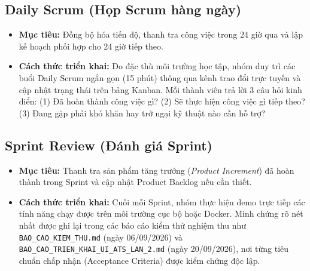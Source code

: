\subsection{Daily Scrum (Họp Scrum hàng ngày)}
\begin{itemize}
    \item \textbf{Mục tiêu:} Đồng bộ hóa tiến độ, thanh tra công việc trong 24 giờ qua và lập kế hoạch phối hợp cho 24 giờ tiếp theo.
    \item \textbf{Cách thức triển khai:} Do đặc thù môi trường học tập, nhóm duy trì các buổi Daily Scrum ngắn gọn (15 phút) thông qua kênh trao đổi trực tuyến và cập nhật trạng thái trên bảng Kanban. Mỗi thành viên trả lời 3 câu hỏi kinh điển: (1) Đã hoàn thành công việc gì? (2) Sẽ thực hiện công việc gì tiếp theo? (3) Đang gặp phải khó khăn hay trở ngại kỹ thuật nào cần hỗ trợ?
\end{itemize}

\subsection{Sprint Review (Đánh giá Sprint)}
\begin{itemize}
    \item \textbf{Mục tiêu:} Thanh tra sản phẩm tăng trưởng (\textit{Product Increment}) đã hoàn thành trong Sprint và cập nhật Product Backlog nếu cần thiết.
    \item \textbf{Cách thức triển khai:} Cuối mỗi Sprint, nhóm thực hiện demo trực tiếp các tính năng chạy được trên môi trường cục bộ hoặc Docker. Minh chứng rõ nét nhất được ghi lại trong các báo cáo kiểm thử nghiệm thu như \texttt{BAO\_CAO\_KIEM\_THU.md} (ngày 06/09/2026) và \texttt{BAO\_CAO\_TRIEN\_KHAI\_UI\_ATS\_LAN\_2.md} (ngày 20/09/2026), nơi từng tiêu chuẩn chấp nhận (Acceptance Criteria) được kiểm chứng độc lập.
\end{itemize}

